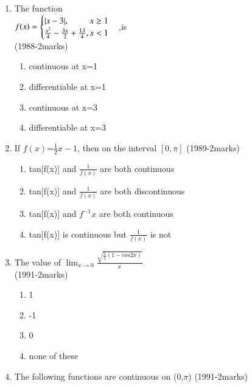 \documentclass[journal,12pt,twocolumn]{IEEEtran}
\theoremstyle{remark}
\begin{document}
\begin{enumerate}
\item The function \\ $f(x)=\begin{cases}|x-3|, \hfill x \geq 1 \\
    \frac{x^2}{4}-\frac{3x}{2}+\frac{13}{4}, \hfill x<1 
\end{cases}$,is \\ \hfill{(1988-2marks)} 
\begin{enumerate}
    \item continuous at x=1
    \item differentiable at x=1
    \item continuous at x=3
    \item differentiable at x=3 \\ 
\end{enumerate}

\item If $f(x)$=$\frac{1}{2}x-1$, then on the interval $[0,\pi]$ \hfill{(1989-2marks)} 
\begin{enumerate}
    \item tan[f(x)] and $\frac{1}{f(x)}$ are both continuous
    \item tan[f(x)] and $\frac{1}{f(x)}$ are both discontinuous
    \item tan[f(x)] and $f^{-1}x$ are both continuous
    \item tan[f(x)] is continuous but $\frac{1}{f(x)}$ is not \\
\end{enumerate}


\item The value of $\lim_{x\to0}{\frac{\sqrt{\frac{1}{2}(1-cos2x)}}{x}}$ \\
\hfill{(1991-2marks)} 
\begin{enumerate}
    \item 1
    \item -1
    \item 0
    \item none of these \\
\end{enumerate}

\item The following functions are continuous on (0,$\pi$) \hfill{(1991-2marks)} 
\end{enumerate}
\end{document}
